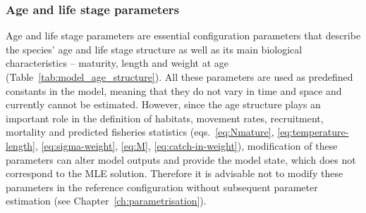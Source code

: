 \subsubsection{Age and life stage parameters} 
Age and life stage parameters are essential configuration parameters that describe the species' age and life stage structure as well as its main biological characteristics -- maturity, length and weight at age (Table~\ref{tab:model_age_structure}). All these parameters are used as predefined constants in the model, meaning that they do not vary in time and space and currently cannot be estimated. However, since the age structure plays an important role in the definition of habitats, movement rates, recruitment, mortality and predicted fisheries statistics (eqs.~\ref{eq:Nmature}, \ref{eq:temperature-length}, \ref{eq:sigma-weight}, \ref{eq:M}, \ref{eq:catch-in-weight}), modification of these parameters can alter model outputs and provide the model state, which does not correspond to the MLE solution. Therefore it is advisable not to modify these parameters in the reference configuration without subsequent parameter estimation (see Chapter~\ref{ch:parametrisation}).


